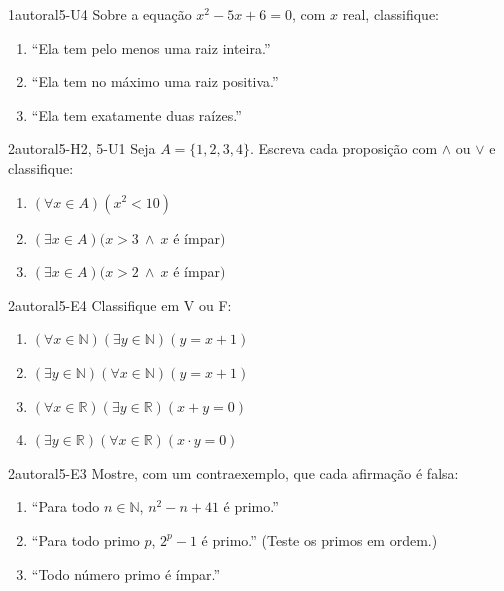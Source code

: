 \begin{questao}{1}{autoral}{5-U4}\label{u5:q4}
Sobre a equação $x^2-5x+6=0$, com $x$ real, classifique:
\begin{enumerate}[label=\alph*)]
  \item \enquote{Ela tem pelo menos uma raiz inteira.}
  \item \enquote{Ela tem no máximo uma raiz positiva.}
  \item \enquote{Ela tem exatamente duas raízes.}
\end{enumerate}
\end{questao}

\begin{questao}{2}{autoral}{5-H2, 5-U1}\label{u5:q5}
Seja $A=\{1,2,3,4\}$. Escreva cada proposição com $\wedge$ ou $\vee$ e classifique:
\begin{enumerate}[label=\alph*)]
  \item $(\forall x\in A)(x^2<10)$
  \item $(\exists x\in A)(x>3\ \wedge\ x$ é ímpar$)$
  \item $(\exists x\in A)(x>2\ \wedge\ x$ é ímpar$)$
\end{enumerate}
\end{questao}

\begin{questao}{2}{autoral}{5-E4}\label{u5:q6}
Classifique em V ou F:
\begin{enumerate}[label=\alph*)]
  \item $(\forall x\in\mathbb{N})(\exists y\in\mathbb{N})(y=x+1)$
  \item $(\exists y\in\mathbb{N})(\forall x\in\mathbb{N})(y=x+1)$
  \item $(\forall x\in\mathbb{R})(\exists y\in\mathbb{R})(x+y=0)$
  \item $(\exists y\in\mathbb{R})(\forall x\in\mathbb{R})(x\cdot y=0)$
\end{enumerate}
\end{questao}

\begin{questao}{2}{autoral}{5-E3}\label{u5:q7}
Mostre, com um contraexemplo, que cada afirmação é falsa:
\begin{enumerate}[label=\alph*)]
  \item \enquote{Para todo $n\in\mathbb{N}$, $n^2-n+41$ é primo.}
  \item \enquote{Para todo primo $p$, $2^p-1$ é primo.} (Teste os primos em ordem.)
  \item \enquote{Todo número primo é ímpar.}
\end{enumerate}
\end{questao}

